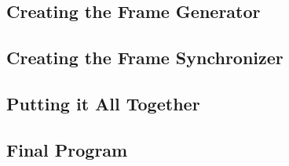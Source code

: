 %
%
\subsection{Creating the Frame Generator}
\label{tutorial:ofdmflexframe:framegen}

%
%
\subsection{Creating the Frame Synchronizer}
\label{tutorial:ofdmflexframe:framesync}

%
%
\subsection{Putting it All Together}
\label{tutorial:ofdmflexframe:xxx}

%
%
\subsection{Final Program}
\label{tutorial:ofdmflexframe:completed}

%

%
